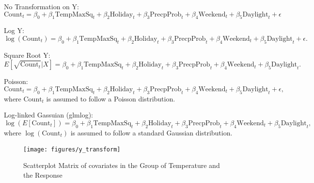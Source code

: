 \documentclass [11pt, proquest] {uwthesis}[2015/03/03]
\begin{document}
No Transformation on Y:
\begin{equation}
\text{Count}_t = \beta_0 + \beta_1 \text{TempMaxSq}_t + \beta_2 \text{Holiday}_t + \beta_3 \text{PrecpProb}_t + \beta_4 \text{Weekend}_t + \beta_5 \text{Daylight}_t + \epsilon \label{eqref:notransymodel}
\end{equation}

Log Y:
\begin{equation}
\log(\text{Count}_t) = \beta_0 + \beta_1 \text{TempMaxSq}_t + \beta_2 \text{Holiday}_t + \beta_3 \text{PrecpProb}_t + \beta_4 \text{Weekend}_t + \beta_5 \text{Daylight}_t + \epsilon.\label{eqref:logy_model}
\end{equation}

Square Root Y:
\begin{equation}
E[\sqrt{\text{Count}_t}|X] = \beta_0 + \beta_1 \text{TempMaxSq}_t + \beta_2 \text{Holiday}_t + \beta_3 \text{PrecpProb}_t + \beta_4 \text{Weekend}_t + \beta_5 \text{Daylight}_t.\label{eqref:sqrty_model}
\end{equation}

Poisson:
\begin{equation}
\text{Count}_t = \beta_0 + \beta_1 \text{TempMaxSq}_t + \beta_2 \text{Holiday}_t + \beta_3 \text{PrecpProb}_t + \beta_4 \text{Weekend}_t + \beta_5 \text{Daylight}_t + \epsilon,\label{eqref:poisson_model}
\end{equation}
where $\text{Count}_t$ is assumed to follow a Poisson distribution.

Log-linked Gassuian (glmlog):
\begin{equation}
\log(E[\text{Count}_t]) = \beta_0 + \beta_1 \text{TempMaxSq}_t + \beta_2 \text{Holiday}_t + \beta_3 \text{PrecpProb}_t + \beta_4 \text{Weekend}_t + \beta_5 \text{Daylight}_t,\label{eqref:glmlog_model}
\end{equation}
where $\log(\text{Count}_t)$ is assumed to follow a standard Gaussian distribution.


\begin{figure}
   \texttt{[image: figures/y\_transform]} 
  \caption{Scatterplot Matrix of covariates in the Group of Temperature and the Response}
  \label{fig:y_transform}
\end{figure}
\end{document}
